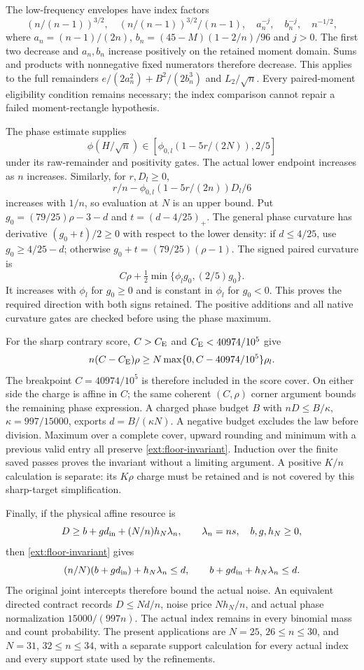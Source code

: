 The low-frequency envelopes have index factors
\[
 (n/(n-1))^{3/2},\quad (n/(n-1))^{3/2}/(n-1),\quad
 a_n^{-j},\quad b_n^{-j},\quad n^{-1/2},
\]
where $a_n=(n-1)/(2n)$, $b_n=(45-M)(1-2/n)/96$ and $j>0$.
The first two decrease and $a_n,b_n$ increase positively on the
retained moment domain. Sums and products with nonnegative fixed
numerators therefore decrease. This applies to the full remainders
$e/(2a_n^2)+B^2/(2b_n^3)$ and $L_2/\sqrt n$.
Every paired-moment eligibility condition remains necessary; the
index comparison cannot repair a failed moment-rectangle hypothesis.

The phase estimate supplies
\[
 \phi(H/\sqrt n)\in[\phi_{0,l}(1-5r/(2N)),2/5]
\]
under its raw-remainder and positivity gates. The actual lower
endpoint increases as $n$ increases. Similarly, for $r,D_l\ge0$,
\[
 r/n-\phi_{0,l}(1-5r/(2n))D_l/6
\]
increases with $1/n$, so evaluation at $N$ is an upper bound.
Put $g_0=(79/25)\rho-3-d$ and $t=(d-4/25)_+$.
The general phase curvature has derivative $(g_0+t)/2\ge0$
with respect to the lower density: if $d\le4/25$, use
$g_0\ge4/25-d$; otherwise $g_0+t=(79/25)(\rho-1)$.
The signed paired curvature is
\[
 C\rho+\tfrac12\min\{\phi_lg_0,(2/5)g_0\}.
\]
It increases with $\phi_l$ for $g_0\ge0$ and is constant in
$\phi_l$ for $g_0<0$. This proves the required direction with
both signs retained. The positive additions and all native
curvature gates are checked before using the phase maximum.

For the sharp contrary score, $C>C_{\mathrm E}$ and $C_{\mathrm E}<40974/10^5$ give
\[
 n(C-C_{\mathrm E})\rho
 \ge N\max\{0,C-40974/10^5\}\rho_l.
\]
The breakpoint $C=40974/10^5$ is therefore included in the score
cover. On either side the charge is affine in $C$; the same coherent
$(C,\rho)$ corner argument bounds the remaining phase expression.
A charged phase budget $B$ with $nD\le B/\kappa$,
$\kappa=997/15000$, exports $d=B/(\kappa N)$.
A negative budget excludes the law before division. Maximum over a
complete cover, upward rounding and minimum with a previous valid
entry all preserve \eqref{ext:floor-invariant}. Induction over the
finite saved passes proves the invariant without a limiting argument.
A positive $K/n$ calculation is separate: its $K\rho$ charge must
be retained and is not covered by this sharp-target simplification.

Finally, if the physical affine resource is
\[
 D\ge b+g d_{\rm in}+(N/n)h_N\lambda_n,
 \qquad \lambda_n=ns,\quad b,g,h_N\ge0,
\]
then \eqref{ext:floor-invariant} gives
\[
 (n/N)(b+g d_{\rm in})+h_N\lambda_n\le d,
 \qquad b+g d_{\rm in}+h_N\lambda_n\le d.
\]
The original joint intercepts therefore bound the actual noise.
An equivalent directed contract records $D\le Nd/n$, noise price
$Nh_N/n$, and actual phase normalization $15000/(997n)$.
The actual index remains in every binomial mass and count probability.
The present applications are $N=25$, $26\le n\le30$, and $N=31$,
$32\le n\le34$, with a separate support calculation for every
actual index and every support state used by the refinements.

